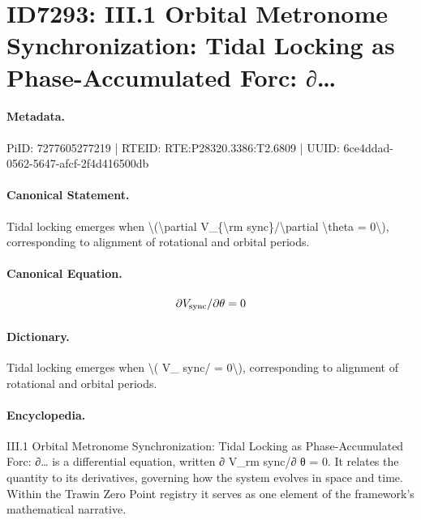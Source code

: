 \section*{ID7293: III.1 Orbital Metronome Synchronization: Tidal Locking as Phase-Accumulated Forc: ∂…}
\paragraph{Metadata.}
PiID: 7277605277219 | RTEID: RTE:P28320.3386:T2.6809 | UUID: 6ce4ddad-0562-5647-afcf-2f4d416500db

\paragraph{Canonical Statement.}
Tidal locking emerges when \textbackslash{}(\textbackslash{}partial V\_\{\textbackslash{}rm sync\}/\textbackslash{}partial \textbackslash{}theta = 0\textbackslash{}), corresponding to alignment of rotational and orbital periods.

\paragraph{Canonical Equation.}
\[
\partial V_{\rm sync}/\partial \theta = 0
\]

\paragraph{Dictionary.}
Tidal locking emerges when \textbackslash{}( V\_ sync/ = 0\textbackslash{}), corresponding to alignment of rotational and orbital periods.

\paragraph{Encyclopedia.}
III.1 Orbital Metronome Synchronization: Tidal Locking as Phase-Accumulated Forc: ∂… is a differential equation, written ∂ V\_rm sync/∂ θ = 0. It relates the quantity to its derivatives, governing how the system evolves in space and time. Within the Trawin Zero Point registry it serves as one element of the framework's mathematical narrative.
